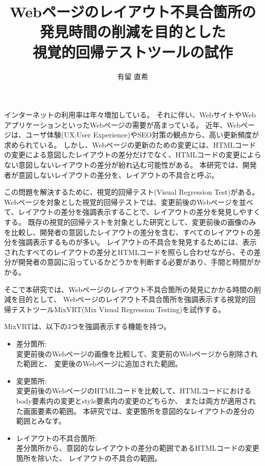 \documentclass[uplatex, report, a4j, 10pt]{jsbook}
\title{Webページのレイアウト不具合箇所の\\発見時間の削減を目的とした\\視覚的回帰テストツール\toolName の試作}
\author{有留 直希}
\newcommand{\toolName}{MixVRT}  %
\begin{document}
\maketitle

%
% 
インターネットの利用率は年々増加している。
それに伴い、WebサイトやWebアプリケーションといったWebページの需要が高まっている。
近年、Webページは、ユーザ体験(UX:User Experience)やSEO対策の観点から、高い更新頻度が求められている。
しかし、Webページの更新のための変更には、HTMLコードの変更による意図したレイアウトの差分だけでなく、HTMLコードの変更によらない意図しないレイアウトの差分が紛れ込む可能性がある。
本研究では、開発者が意図しないレイアウトの差分を、レイアウトの不具合と呼ぶ。
\par
この問題を解決するために、視覚的回帰テスト(Visual Regression Test)がある。
Webページを対象とした視覚的回帰テストでは、変更前後のWebページを並べて、レイアウトの差分を強調表示することで、レイアウトの差分を発見しやすくする。
既存の視覚的回帰テストを対象とした研究として、変更前後の画像のみを比較し、開発者の意図したレイアウトの差分を含む、すべてのレイアウトの差分を強調表示するものが多い。
レイアウトの不具合を発見するためには、表示されたすべてのレイアウトの差分とHTMLコードを照らし合わせながら、その差分が開発者の意図に沿っているかどうかを判断する必要があり、手間と時間がかかる。
\par
そこで本研究では、Webページのレイアウト不具合箇所の発見にかかる時間の削減を目的として、
Webページのレイアウト不具合箇所を強調表示する視覚的回帰テストツール\toolName(Mix Visual Regression Testing)を試作する。
\par
\toolName は、以下の3つを強調表示する機能を持つ。
\begin{itemize}
      \item 差分箇所:\\
            変更前後のWebページの画像を比較して、変更前のWebページから削除された範囲と、
            変更後のWebページに追加された範囲。
      \item 変更箇所:\\
            変更前後のWebページのHTMLコードを比較して、HTMLコードにおけるbody要素内の変更とstyle要素内の変更のどちらか、
            または両方が適用された画面要素の範囲。
            本研究では、変更箇所を意図的なレイアウトの差分の範囲とみなす。
      \item レイアウトの不具合箇所:\\
            差分箇所から、意図的なレイアウトの差分の範囲であるHTMLコードの変更箇所を除いた、
            レイアウトの不具合の範囲。
\end{itemize}
\end{document}
